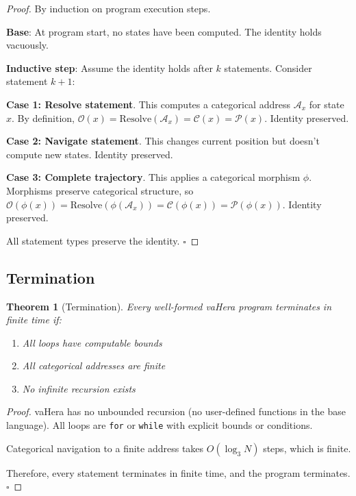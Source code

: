 \documentclass[twocolumn,10pt]{article}
\newcommand{\cataddr}{\mathcal{A}}
\newtheorem{theorem}{Theorem}[section]
\theoremstyle{definition}
\theoremstyle{remark}
\begin{document}
\begin{proof}
By induction on program execution steps.

\textbf{Base}: At program start, no states have been computed. The identity holds vacuously.

\textbf{Inductive step}: Assume the identity holds after $k$ statements. Consider statement $k+1$:

\textbf{Case 1: Resolve statement}. This computes a categorical address $\cataddr_x$ for state $x$. By definition, $\mathcal{O}(x) = \text{Resolve}(\cataddr_x) = \mathcal{C}(x) = \mathcal{P}(x)$. Identity preserved.

\textbf{Case 2: Navigate statement}. This changes current position but doesn't compute new states. Identity preserved.

\textbf{Case 3: Complete trajectory}. This applies a categorical morphism $\phi$. Morphisms preserve categorical structure, so $\mathcal{O}(\phi(x)) = \text{Resolve}(\phi(\cataddr_x)) = \mathcal{C}(\phi(x)) = \mathcal{P}(\phi(x))$. Identity preserved.

All statement types preserve the identity. $\square$
\end{proof}

\subsection{Termination}

\begin{theorem}[Termination]
Every well-formed vaHera program terminates in finite time if:
\begin{enumerate}
    \item All loops have computable bounds
    \item All categorical addresses are finite
    \item No infinite recursion exists
\end{enumerate}
\end{theorem}

\begin{proof}
vaHera has no unbounded recursion (no user-defined functions in the base language). All loops are \texttt{for} or \texttt{while} with explicit bounds or conditions.

Categorical navigation to a finite address takes $O(\log_3 N)$ steps, which is finite.

Therefore, every statement terminates in finite time, and the program terminates. $\square$
\end{proof}
\end{document}
